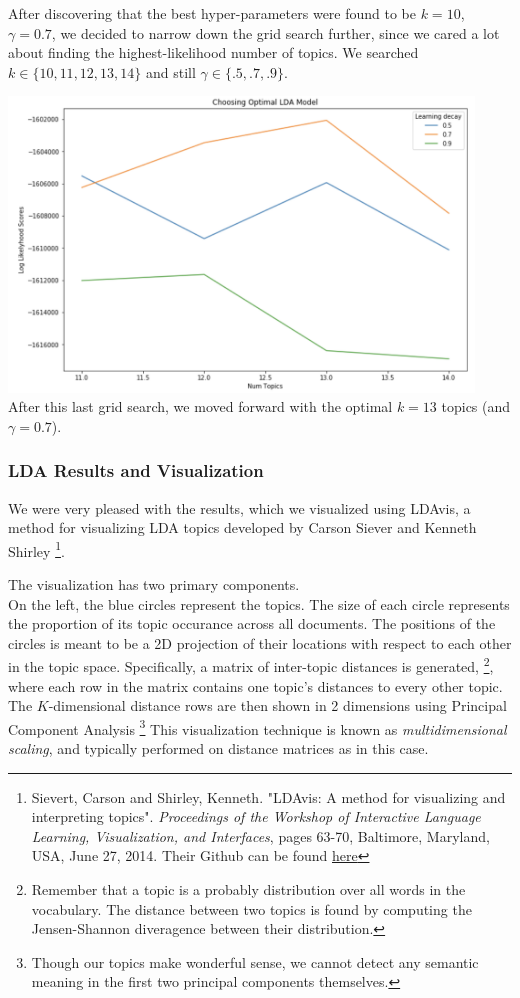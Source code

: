\documentclass[11pt]{article}
\begin{document}
After discovering that the best hyper-parameters were found to be $k=10$, $\gamma = 0.7$, we decided to narrow down the grid search further, since we cared a lot about finding the highest-likelihood number of topics.  We searched $k \in \{10, 11, 12, 13, 14\}$ and still $\gamma \in \{.5, .7, .9\}$.

\includegraphics[width=350pt]{gridsearch2.png} \\

After this last grid search, we moved forward with the optimal $k=13$ topics (and $\gamma = 0.7$). \\


\subsubsection{LDA Results and Visualization}
We were very pleased with the results, which we visualized using LDAvis, a method for visualizing LDA topics developed by Carson Siever and Kenneth Shirley \footnote{Sievert, Carson and Shirley, Kenneth. "LDAvis: A method for visualizing and interpreting topics". \textit{Proceedings of the Workshop of Interactive Language Learning, Visualization, and Interfaces}, pages 63-70, Baltimore, Maryland, USA, June 27, 2014. Their Github can be found \href{https://github.com/cpsievert/LDAvis}{here}}. 

The visualization has two primary components.\\  

On the left, the blue circles represent the topics. The size of each circle represents the proportion of its topic occurance across all documents. The positions of the circles is meant to be a 2D projection of their locations with respect to each other in the topic space. Specifically, a matrix of inter-topic distances is generated, \footnote{Remember that a topic is a probably distribution over all words in the vocabulary. The distance between two topics is found by computing the Jensen-Shannon diveragence between their distribution.}, where each row in the matrix contains one topic's distances to every other topic.  The $K$-dimensional distance rows are then shown in 2 dimensions using Principal Component Analysis \footnote{Though our topics make wonderful sense, we cannot detect any semantic meaning in the first two principal components themselves.} This visualization technique is known as \textit{multidimensional scaling}, and typically performed on distance matrices as in this case. \\
\end{document}
